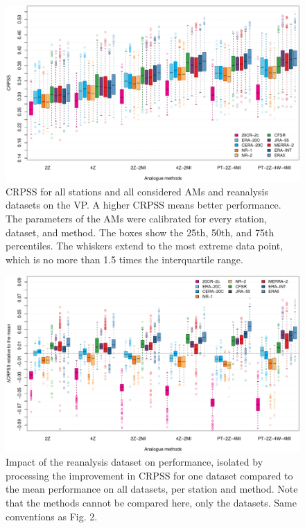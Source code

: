 \documentclass[alpha-refs]{wiley-article}
\begin{document}
\begin{figure}[bt]
	\centering
	\includegraphics[width=\textwidth]{figure-2.pdf}
	\caption{CRPSS for all stations and all considered AMs and reanalysis datasets on the VP. A higher CRPSS means better performance. The parameters of the AMs were calibrated for every station, dataset, and method. The boxes show the 25th, 50th, and 75th percentiles. The whiskers extend to the most extreme data point, which is no more than 1.5 times the interquartile range.}
	\label{fig:comparison_values}
\end{figure}

\begin{figure}[bt]
	\centering
	\includegraphics[width=\textwidth]{figure-3.pdf}
	\caption{Impact of the reanalysis dataset on performance, isolated by processing the improvement in CRPSS for one dataset compared to the mean performance on all datasets, per station and method. Note that the methods cannot be compared here, only the datasets. Same conventions as Fig. 2.}
	\label{fig:comparison_relative}
\end{figure}
\end{document}
